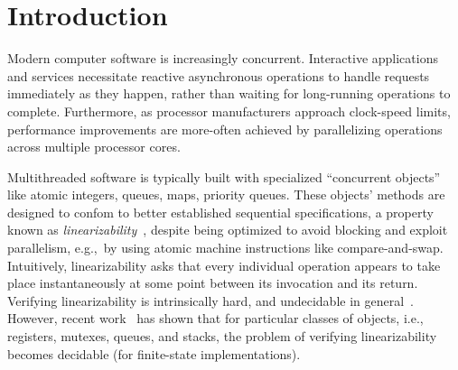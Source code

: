 \section{Introduction}
\label{sec:introduction}


Modern computer software is increasingly concurrent. Interactive applications
and services necessitate reactive asynchronous operations to handle requests
immediately as they happen, rather than waiting for long-running operations to
complete. Furthermore, as processor manufacturers approach clock-speed limits,
performance improvements are more-often achieved by parallelizing operations
across multiple processor cores.




 Multithreaded software is typically built with specialized “concurrent
  objects” like atomic integers, queues, maps, priority queues. These objects’ methods are
  designed to confom to better established sequential specifications, a property known as \emph{linearizability}~\cite{journals/toplas/HerlihyW90},
  despite being optimized to avoid blocking and exploit parallelism, e.g.,~by
  using atomic machine instructions like compare-and-swap. Intuitively, linearizability asks that every individual operation appears to take place instantaneously at some point between its invocation and its return. Verifying linearizability is intrinsically hard, and undecidable in general~\cite{conf/esop/BouajjaniEEH13}. %
However, recent work~\cite{DBLP:conf/icalp/BouajjaniEEH15} has shown that for particular classes of objects, 
i.e., registers, mutexes, queues, and stacks, the problem of verifying linearizability becomes decidable (for finite-state implementations).


